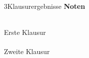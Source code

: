 \documentclass[xcolor=table,9pt,aspectratio=169]{beamer}
\begin{document}
\begin{frame}{\vspace*{10mm}3\hspace*{1em}Klausurergebnisse}
\textbf{Noten}\\
\begin{multicols}{2}
   \begin{center}
      \\Erste Klausur\\
      \\Zweite Klausur\\
   \end{center}
\end{multicols}
\end{frame}
\end{document}
